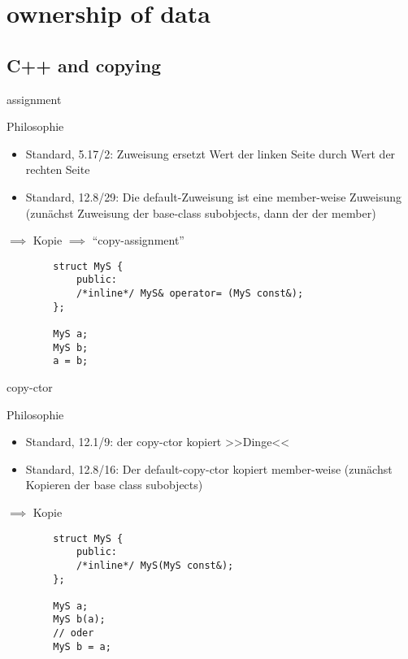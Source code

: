 \section{ownership of data}


\subsection{C++ and copying}

\begin{frame}[fragile]{assignment}
	\begin{block}{Philosophie}
		\begin{itemize}
			\item Standard, 5.17/2: Zuweisung ersetzt Wert der linken Seite durch Wert der rechten Seite
			\item Standard, 12.8/29: Die default-Zuweisung ist eine member-weise Zuweisung (zunächst Zuweisung der base-class subobjects, dann der der member)
		\end{itemize}
		
		$\implies$ Kopie $\implies$ \enquote{copy-assignment}
	\end{block}
	
	\pause
	
	\begin{lstlisting}
		struct MyS {
			public:
			/*inline*/ MyS& operator= (MyS const&);
		};
		
		MyS a;
		MyS b;
		a = b;
	\end{lstlisting}
\end{frame}

\begin{frame}[fragile]{copy-ctor}
	\begin{block}{Philosophie}
		\begin{itemize}
			\item Standard, 12.1/9: der copy-ctor kopiert >>Dinge<<
			\item Standard, 12.8/16: Der default-copy-ctor kopiert member-weise (zunächst Kopieren der base class subobjects)
		\end{itemize}
		
		$\implies$ Kopie
	\end{block}
	
	\begin{lstlisting}
		struct MyS {
			public:
			/*inline*/ MyS(MyS const&);
		};
		
		MyS a;
		MyS b(a);
		// oder
		MyS b = a;
	\end{lstlisting}
\end{frame}

